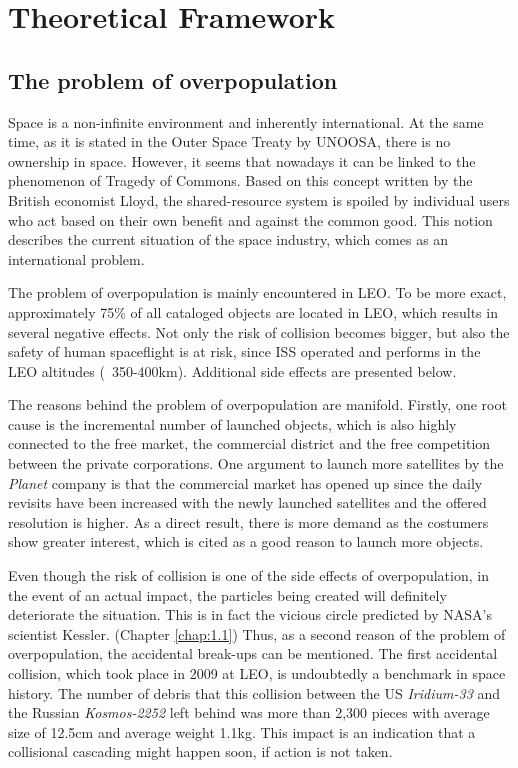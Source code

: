 \chapter{Theoretical Framework}
\label{chap:2}

\section{The problem of overpopulation}
\bigskip

Space is a non-infinite environment and inherently %
international. At the same time, as it is stated in the Outer Space Treaty by UNOOSA, there is no ownership in space. However, it seems that nowadays it can be linked to the phenomenon of Tragedy of Commons. Based on this concept written by the British economist Lloyd, the shared-resource system is spoiled by individual users who act based on their own benefit and against the common good. This notion describes the current situation of the space industry, which comes as an international problem.

The problem of overpopulation is mainly encountered in LEO. To be more exact, approximately 75\% of all cataloged objects are located in LEO, which results in several negative effects. Not only the risk of collision becomes bigger, but also the safety of human spaceflight is at risk, since ISS operated and performs in the LEO altitudes (~350-400km). \cite{Kramer 2002} Additional side effects are presented below.

The reasons behind the problem of overpopulation are manifold. Firstly, one root cause is the incremental number of launched objects, which is also highly connected to the free market, the commercial district and the free competition between the private corporations. %
One argument to launch more satellites by the \textit{Planet} company is that the commercial market has opened up since the daily revisits have been increased with the newly launched satellites and the offered resolution is higher. As a direct result, there is more demand as the costumers show greater interest, which is cited as a good reason to launch more objects. \cite{CNBC}

Even though the risk of collision is one of the side effects of overpopulation, in the event of an actual impact, the particles being created will definitely deteriorate the situation. This is in fact the vicious circle predicted by NASA's scientist Kessler. (Chapter \ref{chap:1.1}) Thus, as a second reason of the problem of overpopulation, the accidental break-ups can be mentioned. The first accidental collision, which took place in 2009 at LEO, is undoubtedly a benchmark in space history. The number of debris that this collision between the US \textit{Iridium-33} and the Russian \textit{Kosmos-2252} left behind was more than 2,300 pieces with average size of 12.5cm and average weight 1.1kg. \cite{Kelso 2009} This impact is an indication that a collisional cascading might happen soon, if action is not taken.

